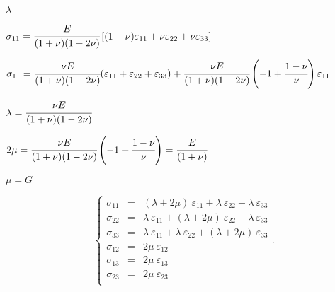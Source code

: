 \documentclass[onecolumn,11pt]{report}
\def\lthtmlcheckvsize{\ifdim\ht\sizebox<\vsize 
  \ifdim\wd\sizebox<\hsize\expandafter\hfill\fi \expandafter\vfill
  \else\expandafter\vss\fi}%
\begin{document}
{\newpage\clearpage
{}%
$ \lambda$%
\lthtmlindisplaymathZ
\lthtmlcheckvsize\clearpage}

{\newpage\clearpage
{}%
$\displaystyle \sigma_{11}  = \cfrac{E}{(1+\nu)(1-2\nu)}
\left[ (1-\nu) \varepsilon_{11} + \nu \varepsilon_{22} + \nu \varepsilon_{33} \right]$%
\lthtmlindisplaymathZ
\lthtmlcheckvsize\clearpage}

{\newpage\clearpage
{}%
$\displaystyle \sigma_{11}  = \cfrac{\nu E}{(1+\nu)(1-2\nu)}
(\varepsilon_{11} + \varepsilon_{22} + \varepsilon_{33})
+  \cfrac{\nu E}{(1+\nu)(1-2\nu)} \left( -1 + \cfrac{1-\nu}{\nu} \right) \varepsilon_{11}$%
\lthtmlindisplaymathZ
\lthtmlcheckvsize\clearpage}

{\newpage\clearpage
{}%
$\displaystyle \lambda = \cfrac{\nu E}{(1+\nu)(1-2\nu)}$%
\lthtmlindisplaymathZ
\lthtmlcheckvsize\clearpage}

{\newpage\clearpage
{}%
$\displaystyle 2\mu =  \cfrac{\nu E}{(1+\nu)(1-2\nu)} \left( -1 + \cfrac{1-\nu}{\nu} \right) = \cfrac{E}{(1+\nu)}$%
\lthtmlindisplaymathZ
\lthtmlcheckvsize\clearpage}

{\newpage\clearpage
{}%
$ \mu = G$%
\lthtmlindisplaymathZ
\lthtmlcheckvsize\clearpage}

{\newpage\clearpage
{}%
\begin{displaymath}\left\lbrace
\begin{array}{rcl}
\sigma_{11} & = & (\lambda + 2 \mu) \: \varepsilon_{11} + \lambda \: \varepsilon_{22} + \lambda \: \varepsilon_{33}\\
\sigma_{22} & = & \lambda \: \varepsilon_{11} + (\lambda + 2 \mu) \: \varepsilon_{22} + \lambda \: \varepsilon_{33}\\
\sigma_{33} & = & \lambda \: \varepsilon_{11} + \lambda \: \varepsilon_{22} + (\lambda + 2 \mu) \: \varepsilon_{33}\\
\sigma_{12} & = & 2 \mu \: \varepsilon_{12}\\
\sigma_{13} & = & 2 \mu \: \varepsilon_{13}\\
\sigma_{23} & = & 2 \mu \: \varepsilon_{23}\\
\end{array}
\right. \text{.}\end{displaymath}%
\lthtmldisplayZ
\lthtmlcheckvsize\clearpage}
\end{document}

